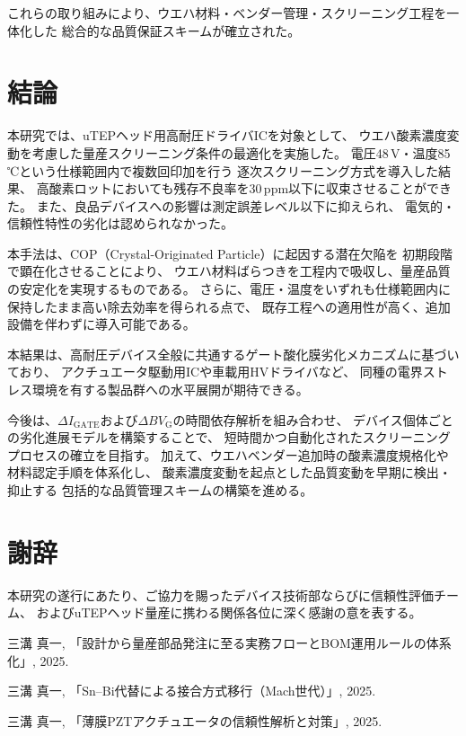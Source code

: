 \documentclass[twocolumn]{ieeetran}
\begin{document}
これらの取り組みにより、ウエハ材料・ベンダー管理・スクリーニング工程を一体化した
総合的な品質保証スキームが確立された。

\section{結論}

本研究では、uTEPヘッド用高耐圧ドライバICを対象として、
ウエハ酸素濃度変動を考慮した量産スクリーニング条件の最適化を実施した。
電圧48\,V・温度85\,℃という仕様範囲内で複数回印加を行う
逐次スクリーニング方式を導入した結果、
高酸素ロットにおいても残存不良率を30\,ppm以下に収束させることができた。
また、良品デバイスへの影響は測定誤差レベル以下に抑えられ、
電気的・信頼性特性の劣化は認められなかった。

本手法は、COP（Crystal-Originated Particle）に起因する潜在欠陥を
初期段階で顕在化させることにより、
ウエハ材料ばらつきを工程内で吸収し、量産品質の安定化を実現するものである。
さらに、電圧・温度をいずれも仕様範囲内に保持したまま高い除去効率を得られる点で、
既存工程への適用性が高く、追加設備を伴わずに導入可能である。

本結果は、高耐圧デバイス全般に共通するゲート酸化膜劣化メカニズムに基づいており、
アクチュエータ駆動用ICや車載用HVドライバなど、
同種の電界ストレス環境を有する製品群への水平展開が期待できる。

今後は、$\Delta I_\mathrm{GATE}$および$\Delta BV_\mathrm{G}$の時間依存解析を組み合わせ、
デバイス個体ごとの劣化進展モデルを構築することで、
短時間かつ自動化されたスクリーニングプロセスの確立を目指す。
加えて、ウエハベンダー追加時の酸素濃度規格化や材料認定手順を体系化し、
酸素濃度変動を起点とした品質変動を早期に検出・抑止する
包括的な品質管理スキームの構築を進める。

\section*{謝辞}
本研究の遂行にあたり、ご協力を賜ったデバイス技術部ならびに信頼性評価チーム、
およびuTEPヘッド量産に携わる関係各位に深く感謝の意を表する。

\begin{thebibliography}{99}

三溝 真一, 「設計から量産部品発注に至る実務フローとBOM運用ルールの体系化」, 2025.

三溝 真一, 「Sn–Bi代替による接合方式移行（Mach世代）」, 2025.

三溝 真一, 「薄膜PZTアクチュエータの信頼性解析と対策」, 2025.

\end{thebibliography}
\end{document}
